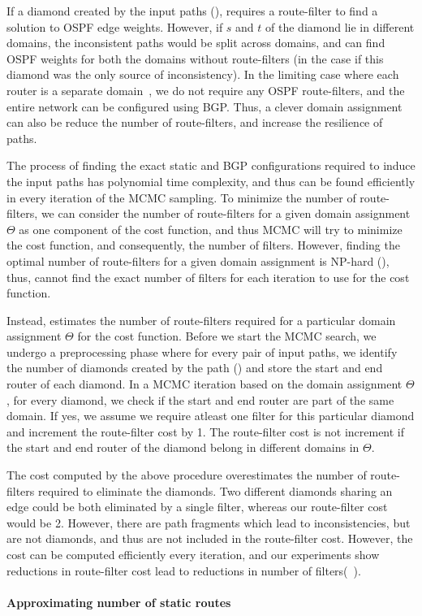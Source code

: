 If a diamond created by the input paths (),
\name requires a route-filter to find a solution to OSPF
edge weights. However, if $s$ and $t$ of the diamond lie in
different domains, the inconsistent paths would be split 
across domains, and \name can find OSPF weights for
both the domains without route-filters (in the case if this
diamond was the only source of inconsistency). In the limiting
case where each router is a separate domain~\cite{bgpdatacenter}, 
we do not require any OSPF route-filters, and the entire 
network can be configured using BGP. Thus, a clever domain
assignment can also be reduce the number of route-filters, and
increase the resilience of paths. 


The process of finding the exact static and BGP configurations
required to induce the input paths has polynomial time complexity,
and thus can be found efficiently in every iteration of the MCMC
sampling. To minimize the number of route-filters, we can consider 
the number of route-filters for a given domain assignment $\Theta$ 
as one component of the cost function, and thus MCMC will try
to minimize the cost function, and consequently, the number of
filters. However, finding the optimal number of route-filters for a given domain assignment is NP-hard (), thus, \name
cannot find the exact number of filters for each iteration to use for
the cost function. 

Instead, \name estimates the number of route-filters required for a 
particular domain assignment $\Theta$ for the cost function. Before 
we start the MCMC search, we undergo a preprocessing phase 
where for every pair of input paths, we identify the
number of diamonds created by the path () and store the start and end router of 
each diamond. In a MCMC iteration based on the domain
assignment $\Theta$, for every diamond, we check if the
start and end router are part of the same domain. If yes, 
we assume we require atleast one filter for this particular
diamond and increment the route-filter cost by 1. The 
route-filter cost is not increment if the start and end 
router of the diamond belong in different domains in $\Theta$.

The cost computed by the above procedure overestimates the
number of route-filters required to eliminate the diamonds.  
Two different diamonds sharing an edge could be both 
eliminated by a single filter, whereas our route-filter cost 
would be 2. However, there are path fragments which 
lead to inconsistencies, but are not diamonds, and thus
are not included in the route-filter cost. However, the 
cost can be computed efficiently every iteration, and 
our experiments show reductions in route-filter cost 
lead to reductions in number of filters(~). 

\paragraph{Approximating number of static routes}
